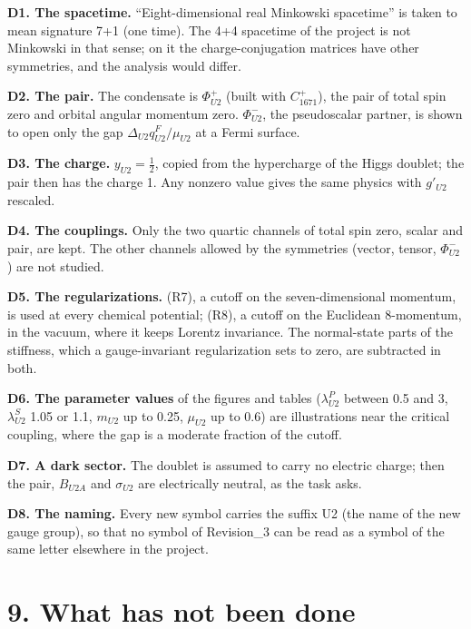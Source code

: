 \documentclass[
  10pt,
]{article}
\begin{document}
\textbf{D1. The spacetime.} ``Eight-dimensional real Minkowski
spacetime'' is taken to mean signature 7+1 (one time). The 4+4 spacetime
of the project is not Minkowski in that sense; on it the
charge-conjugation matrices have other symmetries, and the analysis
would differ.

\textbf{D2. The pair.} The condensate is \(\Phi^+_{U2}\) (built with
\(C^+_{1671}\)), the pair of total spin zero and orbital angular
momentum zero. \(\Phi^-_{U2}\), the pseudoscalar partner, is shown to
open only the gap \(\Delta_{U2}q^F_{U2}/\mu_{U2}\) at a Fermi surface.

\textbf{D3. The charge.} \(y_{U2}=\tfrac12\), copied from the
hypercharge of the Higgs doublet; the pair then has the charge 1. Any
nonzero value gives the same physics with \(g'_{U2}\) rescaled.

\textbf{D4. The couplings.} Only the two quartic channels of total spin
zero, scalar and pair, are kept. The other channels allowed by the
symmetries (vector, tensor, \(\Phi^-_{U2}\)) are not studied.

\textbf{D5. The regularizations.} (R7), a cutoff on the
seven-dimensional momentum, is used at every chemical potential; (R8), a
cutoff on the Euclidean 8-momentum, in the vacuum, where it keeps
Lorentz invariance. The normal-state parts of the stiffness, which a
gauge-invariant regularization sets to zero, are subtracted in both.

\textbf{D6. The parameter values} of the figures and tables
(\(\lambda^P_{U2}\) between 0.5 and 3, \(\lambda^S_{U2}\) 1.05 or 1.1,
\(m_{U2}\) up to 0.25, \(\mu_{U2}\) up to 0.6) are illustrations near
the critical coupling, where the gap is a moderate fraction of the
cutoff.

\textbf{D7. A dark sector.} The doublet is assumed to carry no electric
charge; then the pair, \(B_{U2A}\) and \(\sigma_{U2}\) are electrically
neutral, as the task asks.

\textbf{D8. The naming.} Every new symbol carries the suffix U2 (the
name of the new gauge group), so that no symbol of Revision\_3 can be
read as a symbol of the same letter elsewhere in the project.

\hypertarget{what-has-not-been-done}{%
\section{9. What has not been done}\label{what-has-not-been-done}}
\end{document}
